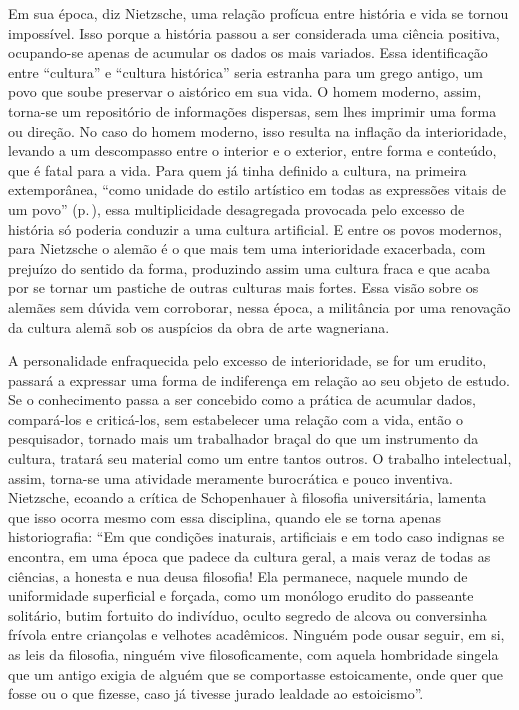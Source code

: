 Em sua época, diz Nietzsche, uma relação profícua entre história e vida
se tornou impossível. Isso porque a história passou a ser considerada
uma ciência positiva, ocupando-se apenas de acumular os dados os mais
variados. Essa identificação entre ``cultura'' e ``cultura histórica''
seria estranha para um grego antigo, um povo que soube preservar o
aistórico em sua vida. O homem moderno, assim, torna-se um repositório
de informações dispersas, sem lhes imprimir uma forma ou direção. No
caso do homem moderno, isso resulta na inflação da interioridade,
levando a um descompasso entre o interior e o exterior, entre forma e
conteúdo, que é fatal para a vida. Para quem já tinha definido a
cultura, na primeira extemporânea, ``como unidade do estilo artístico em
todas as expressões vitais de um povo'' (p.\,\pageref{vitaisdeumpovo}), essa multiplicidade
desagregada provocada pelo excesso de história só poderia conduzir a uma
cultura artificial. E entre os povos modernos, para Nietzsche o alemão é
o que mais tem uma interioridade exacerbada, com prejuízo do sentido da
forma, produzindo assim uma cultura fraca e que acaba por se tornar um
pastiche de outras culturas mais fortes. Essa visão sobre os alemães sem
dúvida vem corroborar, nessa época, a militância por uma renovação da
cultura alemã sob os auspícios da obra de arte wagneriana.

A personalidade enfraquecida pelo excesso de interioridade, se for um
erudito, passará a expressar uma forma de indiferença em relação ao seu
objeto de estudo. Se o conhecimento passa a ser concebido como a prática
de acumular dados, compará-los e criticá-los, sem estabelecer uma
relação com a vida, então o pesquisador, tornado mais um trabalhador
braçal do que um instrumento da cultura, tratará seu material como um
entre tantos outros. O trabalho intelectual, assim, torna-se uma
atividade meramente burocrática e pouco inventiva. Nietzsche, ecoando a
crítica de Schopenhauer à filosofia universitária, lamenta que isso
ocorra mesmo com essa disciplina, quando ele se torna apenas
historiografia: ``Em que condições inaturais, artificiais e em todo caso
indignas se encontra, em uma época que padece da cultura geral, a mais
veraz de todas as ciências, a honesta e nua deusa filosofia! Ela
permanece, naquele mundo de uniformidade superficial e forçada, como um
monólogo erudito do passeante solitário, butim fortuito do indivíduo,
oculto segredo de alcova ou conversinha frívola entre criançolas e
velhotes acadêmicos. Ninguém pode ousar seguir, em si, as leis da
filosofia, ninguém vive filosoficamente, com aquela hombridade singela
que um antigo exigia de alguém que se comportasse estoicamente, onde
quer que fosse ou o que fizesse, caso já tivesse jurado lealdade ao
estoicismo''.

